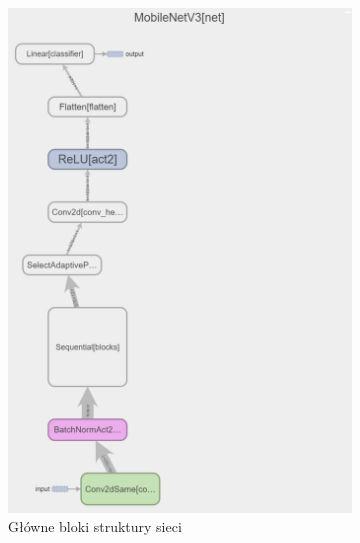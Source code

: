 \documentclass[12pt,twoside]{article}
\begin{document}
\begin{figure}[ht]
	\centering
	\begin{subfigure}[b]{0.4\textwidth}
	  \includegraphics[width=\textwidth]{figures/v3_main.png}
	  \caption{Główne bloki struktury sieci}
	  \label{fig:obraz1}
	\end{subfigure}
	\hfill
	\begin{subfigure}[b]{0.4\textwidth}

\end{subfigure}
\end{figure}
\end{document}
